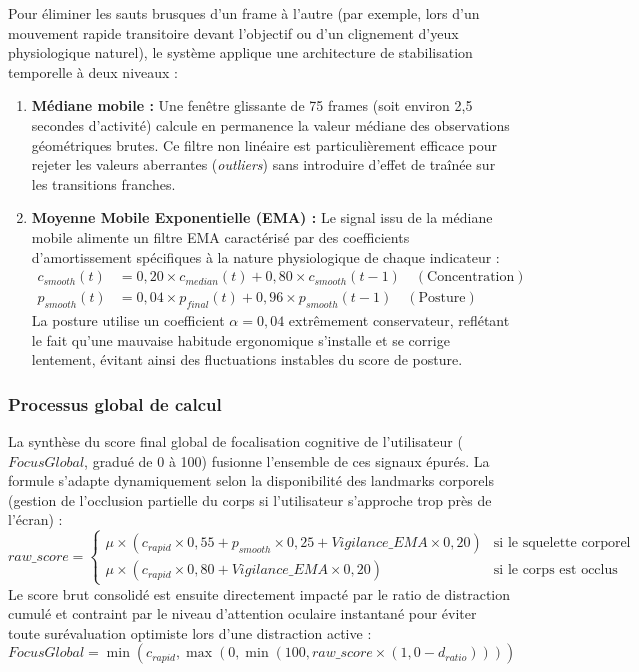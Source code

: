 Pour éliminer les sauts brusques d'un frame à l'autre (par exemple, lors d'un mouvement rapide transitoire devant l'objectif ou d'un clignement d'yeux physiologique naturel), le système applique une architecture de stabilisation temporelle à deux niveaux :
\begin{enumerate}
    \item \textbf{Médiane mobile :} Une fenêtre glissante de 75 frames (soit environ 2,5 secondes d'activité) calcule en permanence la valeur médiane des observations géométriques brutes. Ce filtre non linéaire est particulièrement efficace pour rejeter les valeurs aberrantes (\textit{outliers}) sans introduire d'effet de traînée sur les transitions franches.
    \item \textbf{Moyenne Mobile Exponentielle (EMA) :} Le signal issu de la médiane mobile alimente un filtre EMA caractérisé par des coefficients d'amortissement spécifiques à la nature physiologique de chaque indicateur :
    \begin{align*}
        c_{smooth}(t) &= 0,20 \times c_{median}(t) + 0,80 \times c_{smooth}(t-1) \quad (\text{Concentration}) \\
        p_{smooth}(t) &= 0,04 \times p_{final}(t) + 0,96 \times p_{smooth}(t-1) \quad (\text{Posture})
    \end{align*}
    La posture utilise un coefficient $\alpha = 0,04$ extrêmement conservateur, reflétant le fait qu'une mauvaise habitude ergonomique s'installe et se corrige lentement, évitant ainsi des fluctuations instables du score de posture.
\end{enumerate}

\subsubsection{Processus global de calcul}

La synthèse du score final global de focalisation cognitive de l'utilisateur ($FocusGlobal$, gradué de 0 à 100) fusionne l'ensemble de ces signaux épurés. La formule s'adapte dynamiquement selon la disponibilité des landmarks corporels (gestion de l'occlusion partielle du corps si l'utilisateur s'approche trop près de l'écran) :
\begin{equation}
    raw\_score = \begin{cases}
        \mu \times \left(c_{rapid} \times 0,55 + p_{smooth} \times 0,25 + Vigilance\_EMA \times 0,20\right) & \text{si le squelette corporel est détecté} \\
        \mu \times \left(c_{rapid} \times 0,80 + Vigilance\_EMA \times 0,20\right) & \text{si le corps est occlus}
    \end{cases}
\end{equation}
Le score brut consolidé est ensuite directement impacté par le ratio de distraction cumulé et contraint par le niveau d'attention oculaire instantané pour éviter toute surévaluation optimiste lors d'une distraction active :
\begin{equation}
    FocusGlobal = \min\left(c_{rapid}, \max\left(0, \min\left(100, raw\_score \times \left(1,0 - d_{ratio}\right)\right)\right)\right)
\end{equation}

